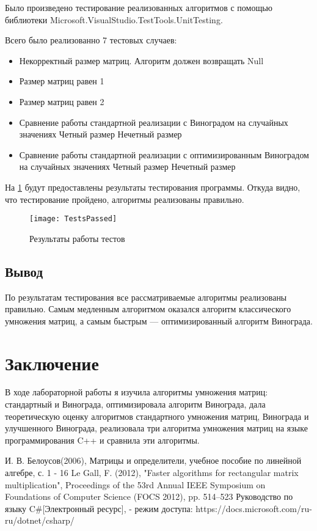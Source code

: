 \documentclass[12pt]{report}
\begin{document}
Было произведено тестирование реализованных алгоритмов с помощью библиотеки Microsoft.VisualStudio.TestTools.UnitTesting.

Всего было реализованно 7 тестовых случаев:
\begin{itemize}
	\item Некорректный размер матриц. Алгоритм должен возвращать Null
	\item Размер матриц равен 1
	\item Размер матриц равен 2
	\item Сравнение работы стандартной реализации с Виноградом на случайных значениях
	\subitem Четный размер
	\subitem Нечетный размер
	\item Сравнение работы стандартной реализации с оптимизированным Виноградом на случайных значениях
	\subitem Четный размер
	\subitem Нечетный размер
\end{itemize}

На \ref{fig:test} будут предоставлены результаты тестирования программы. Откуда видно, что тестирование пройдено, алгоритмы реализованы правильно.
\begin{figure}[!htbp]
\centering
\texttt{[image: TestsPassed]}
\caption{Результаты работы тестов}
\label{fig:test}
\end{figure} 


\section{Вывод}
По результатам тестирования все рассматриваемые алгоритмы реализованы правильно. Самым медленным алгоритмом оказался алгоритм классического умножения матриц, а самым быстрым — оптимизированный алгоритм Винограда.

\chapter*{Заключение}
В ходе лабораторной работы я изучила алгоритмы умножения матриц: стандартный и Винограда, оптимизировала алгоритм Винограда, дала теоретическую оценку алгоритмов стандартного умножения матриц, Винограда и улучшенного Винограда, реализовала три алгоритма умножения матриц на языке программирования C++ и сравнила эти алгоритмы.

 \begin{thebibliography}{3}
И. В. Белоусов(2006), Матрицы и определители, учебное пособие по линейной алгебре, с. 1 - 16
Le Gall, F. (2012), "Faster algorithms for rectangular matrix multiplication", Proceedings of the 53rd Annual IEEE Symposium on Foundations of Computer Science (FOCS 2012), pp. 514–523
Руководство по языку C\#[Электронный ресурс], - режим доступа: https://docs.microsoft.com/ru-ru/dotnet/csharp/
\end{thebibliography}
\end{document}

